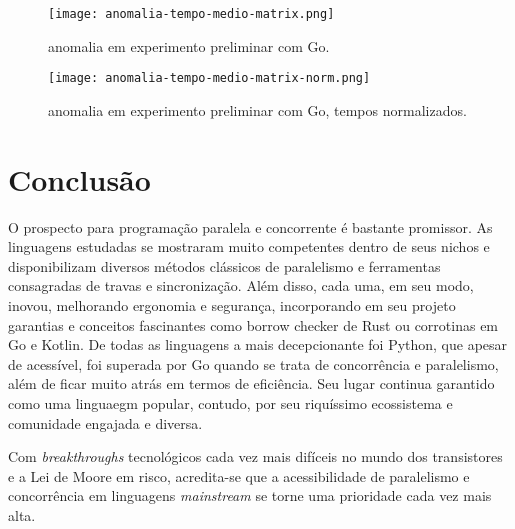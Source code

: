 \documentclass{article}
\begin{document}
\begin{figure}[t] %
    \centering
    \texttt{[image: anomalia-tempo-medio-matrix.png]}
    \caption{anomalia em experimento preliminar com Go.}
    \label{fig:anomalia matrix GO}
\end{figure}

\begin{figure}[t] %
    \centering
    \texttt{[image: anomalia-tempo-medio-matrix-norm.png]}
    \caption{anomalia em experimento preliminar com Go, tempos normalizados.}
    \label{fig:anomalia matrix norm GO}
\end{figure}

\section{Conclusão}
\label{sec:conclusao}

O prospecto para programação paralela e concorrente é bastante promissor. As linguagens estudadas se mostraram muito competentes dentro de seus nichos e disponibilizam diversos métodos clássicos de paralelismo e ferramentas consagradas de travas e sincronização. Além disso, cada uma, em seu modo, inovou, melhorando ergonomia e segurança, incorporando em seu projeto garantias e conceitos fascinantes como borrow checker de Rust ou corrotinas em Go e Kotlin.
De todas as linguagens a mais decepcionante foi Python, que apesar de acessível, foi superada por Go quando se trata de concorrência e paralelismo, além de ficar muito atrás em termos de eficiência. Seu lugar continua garantido como uma linguaegm popular, contudo, por seu riquíssimo ecossistema e comunidade engajada e diversa.

Com \emph{breakthroughs} tecnológicos cada vez mais difíceis no mundo dos transistores e a Lei de Moore em risco, acredita-se que a acessibilidade de paralelismo e concorrência em linguagens \emph{mainstream} se torne uma prioridade cada vez mais alta.





\end{document}
